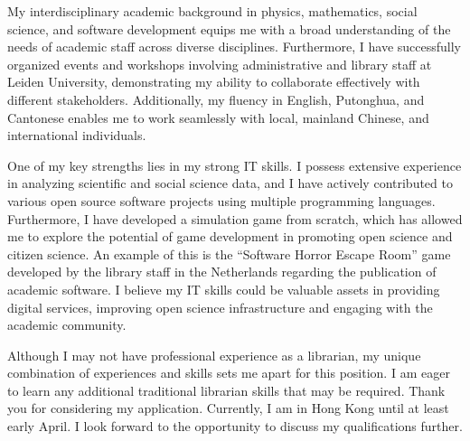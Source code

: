 \documentclass[11pt, a4paper]{awesome-cv}
\begin{document}
\begin{cvletter}
My interdisciplinary academic background in physics, mathematics, social science, and software development equips me with a broad understanding of the needs of academic staff across diverse disciplines. Furthermore, I have successfully organized events and workshops involving administrative and library staff at Leiden University, demonstrating my ability to collaborate effectively with different stakeholders. Additionally, my fluency in English, Putonghua, and Cantonese enables me to work seamlessly with local, mainland Chinese, and international individuals.

One of my key strengths lies in my strong IT skills. I possess extensive experience in analyzing scientific and social science data, and I have actively contributed to various open source software projects using multiple programming languages. Furthermore, I have developed a simulation game from scratch, which has allowed me to explore the potential of game development in promoting open science and citizen science. An example of this is the ``Software Horror Escape Room'' game developed by the library staff in the Netherlands regarding the publication of academic software. I believe my IT skills could be valuable assets in providing digital services, improving open science infrastructure and engaging with the academic community.

Although I may not have professional experience as a librarian, my unique combination of experiences and skills sets me apart for this position. I am eager to learn any additional traditional librarian skills that may be required. Thank you for considering my application. Currently, I am in Hong Kong until at least early April. I look forward to the opportunity to discuss my qualifications further.


\end{cvletter}


\makeletterclosing
\end{document}
